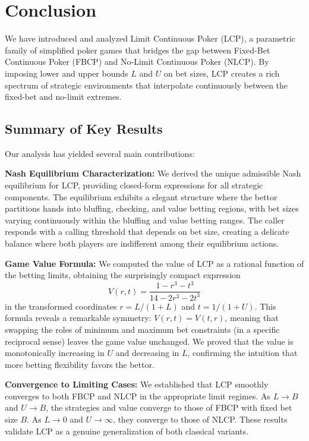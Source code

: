 \documentclass[../../main/main.tex]{subfiles}
\begin{document}
\section{Conclusion}

We have introduced and analyzed Limit Continuous Poker (LCP), a parametric family of simplified poker games that bridges the gap between Fixed-Bet Continuous Poker (FBCP) and No-Limit Continuous Poker (NLCP). By imposing lower and upper bounds $L$ and $U$ on bet sizes, LCP creates a rich spectrum of strategic environments that interpolate continuously between the fixed-bet and no-limit extremes.

\subsection{Summary of Key Results}

Our analysis has yielded several main contributions:

\textbf{Nash Equilibrium Characterization:} We derived the unique admissible Nash equilibrium for LCP, providing closed-form expressions for all strategic components. The equilibrium exhibits a elegant structure where the bettor partitions hands into bluffing, checking, and value betting regions, with bet sizes varying continuously within the bluffing and value betting ranges. The caller responds with a calling threshold that depends on bet size, creating a delicate balance where both players are indifferent among their equilibrium actions.

\textbf{Game Value Formula:} We computed the value of LCP as a rational function of the betting limits, obtaining the surprisingly compact expression
\[
V(r,t) = \frac{1 - r^3 - t^3}{14 - 2r^3 - 2t^3}
\]
in the transformed coordinates $r = L/(1+L)$ and $t = 1/(1+U)$. This formula reveals a remarkable symmetry: $V(r,t) = V(t,r)$, meaning that swapping the roles of minimum and maximum bet constraints (in a specific reciprocal sense) leaves the game value unchanged. We proved that the value is monotonically increasing in $U$ and decreasing in $L$, confirming the intuition that more betting flexibility favors the bettor.

\textbf{Convergence to Limiting Cases:} We established that LCP smoothly converges to both FBCP and NLCP in the appropriate limit regimes. As $L \to B$ and $U \to B$, the strategies and value converge to those of FBCP with fixed bet size $B$. As $L \to 0$ and $U \to \infty$, they converge to those of NLCP. These results validate LCP as a genuine generalization of both classical variants.
\end{document}
